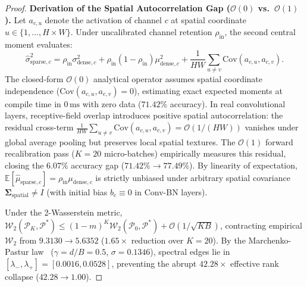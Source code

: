 \documentclass{article}
\begin{document}
\begin{proof}
\noindent\textbf{Derivation of the Spatial Autocorrelation Gap ($\mathcal{O}(0)$ vs.\ $\mathcal{O}(1)$).} Let $a_{c, u}$ denote the activation of channel $c$ at spatial coordinate $u \in \{1, \dots, H \times W\}$. Under uncalibrated channel retention $\rho_{\mathrm{in}}$, the second central moment evaluates:
\begin{equation}
\hat{\sigma}_{\mathrm{sparse}, c}^2 = \rho_{\mathrm{in}}\sigma_{\mathrm{dense}, c}^2 + \rho_{\mathrm{in}}(1 - \rho_{\mathrm{in}})\mu_{\mathrm{dense}, c}^2 + \frac{1}{H W}\sum_{u \ne v} \mathrm{Cov}(a_{c, u}, a_{c, v}).
\end{equation}
The closed-form $\mathcal{O}(0)$ analytical operator assumes spatial coordinate independence ($\mathrm{Cov}(a_{c, u}, a_{c, v}) = 0$), estimating exact expected moments at compile time in $0\,\text{ms}$ with zero data ($71.42\%$ accuracy). In real convolutional layers, receptive-field overlap introduces positive spatial autocorrelation: the residual cross-term $\frac{1}{HW}\sum_{u \ne v} \mathrm{Cov}(a_{c, u}, a_{c, v}) = \mathcal{O}(1/(HW))$ vanishes under global average pooling but preserves local spatial textures. The $\mathcal{O}(1)$ forward recalibration pass ($K=20$ micro-batches) empirically measures this residual, closing the $6.07\%$ accuracy gap ($71.42\% \to 77.49\%$). By linearity of expectation, $\mathbb{E}[\hat{\mu}_{\mathrm{sparse}, c}] = \rho_{\mathrm{in}} \mu_{\mathrm{dense}, c}$ is strictly unbiased under arbitrary spatial covariance $\mathbf{\Sigma}_{\mathrm{spatial}} \ne I$ (with initial bias $b_c \equiv 0$ in Conv-BN layers).

Under the 2-Wasserstein metric, $\mathcal{W}_2(\mathcal{P}_K, \mathcal{P}^*) \le (1-m)^K \mathcal{W}_2(\mathcal{P}_0, \mathcal{P}^*) + \mathcal{O}(1/\sqrt{KB})$, contracting empirical $\mathcal{W}_2$ from $9.3130 \to 5.6352$ ($1.65\times$ reduction over $K=20$). By the Marchenko-Pastur law~\cite{marchenko1967distribution} ($\gamma = d/B = 0.5$, $\sigma = 0.1346$), spectral edges lie in $[\lambda_-, \lambda_+] = [0.0016, 0.0528]$, preventing the abrupt $42.28\times$ effective rank collapse ($42.28 \to 1.00$).
\end{proof}
\end{document}
